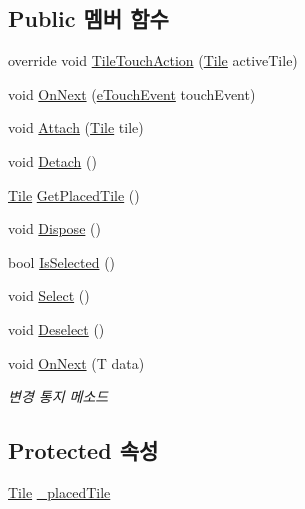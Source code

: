 \subsection*{Public 멤버 함수}
\begin{DoxyCompactItemize}
\item 
override void \hyperlink{class_moveable_object_a8aa14fd4e56b9911e895f5e899e0d9a0}{Tile\+Touch\+Action} (\hyperlink{class_tile}{Tile} active\+Tile)
\item 
void \hyperlink{class_moveable_object_aeba5445de84542260b21e15e1308f712}{On\+Next} (\hyperlink{_touch_manager_8cs_ae33e321a424fe84ba8b2fdb81ad40a68}{e\+Touch\+Event} touch\+Event)
\item 
void \hyperlink{class_placeable_object_a3176ec3d5d26b2a83cdc58b01e630aa1}{Attach} (\hyperlink{class_tile}{Tile} tile)
\item 
void \hyperlink{class_placeable_object_aef2018b58bf7c8c0fab5aaf3d9a154d4}{Detach} ()
\item 
\hyperlink{class_tile}{Tile} \hyperlink{class_placeable_object_ab44a9b122632ac3cf0babb5040e8a201}{Get\+Placed\+Tile} ()
\item 
void \hyperlink{class_placeable_object_a8bd49b7db556556502a0518fc833be48}{Dispose} ()
\item 
bool \hyperlink{class_placeable_object_a71fd42914caa0dc6229fe6a5ffe09b99}{Is\+Selected} ()
\item 
void \hyperlink{class_placeable_object_a019818f3f6c6eb715fed163efa921f5a}{Select} ()
\item 
void \hyperlink{class_placeable_object_a0c1248b1f9981ddbf68e6f70a6498f3d}{Deselect} ()
\item 
void \hyperlink{interface_m_c_n_1_1_i_observer_a2f934b71aa4ddf6f936670d32c3cdff7}{On\+Next} (T data)
\begin{DoxyCompactList}\small\item\em 변경 통지 메소드 \end{DoxyCompactList}\end{DoxyCompactItemize}
\subsection*{Protected 속성}
\begin{DoxyCompactItemize}
\item 
\hyperlink{class_tile}{Tile} \hyperlink{class_placeable_object_a0fd0566f0bb15c71b0630322762342d8}{\+\_\+placed\+Tile}
\end{DoxyCompactItemize}
